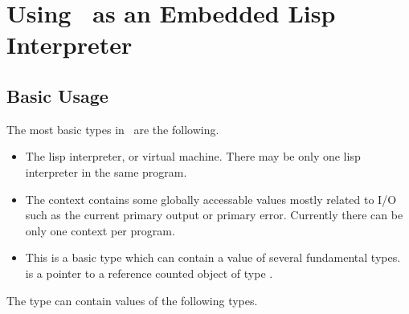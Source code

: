 %
%
%
%
%
\section{Using \lips\ as an Embedded Lisp Interpreter}
\subsection{Basic Usage}
The most basic types in \lips\ are the following.
\begin{itemize}
  \item {} The lisp interpreter, or virtual machine. There
    may be only one lisp interpreter in the same program.
  \item {} The context contains some globally
    accessable values mostly related to I/O such as the current
    primary output or primary error. Currently there can be only one
    context per program.
  \item {} This is a basic type which can contain a value
    of several fundamental types.  is a pointer to a
    reference counted object of type .
\end{itemize}

The  type can contain values of the following types.

